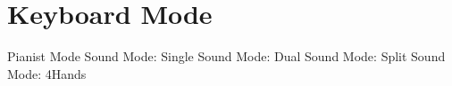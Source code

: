 \section{Keyboard Mode}
Pianist Mode
Sound Mode: Single
Sound Mode: Dual
Sound Mode: Split
Sound Mode: 4Hands
